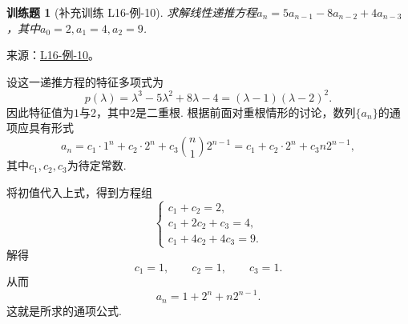 \documentclass[UTF8,12pt,a4paper,fontset=fandol]{ctexart}
\newtheorem{exercise}{训练题}[section]
\begin{document}
\begin{exercise}[补充训练 L16-例-10]\label{prob:L16-例-10}
求解线性递推方程$a_n = 5a_{n - 1} - 8a_{n - 2} + 4a_{n - 3}$，其中$a_0 = 2, a_1 = 4, a_2 = 9$.
\end{exercise}
\noindent 来源：\href{https://github.com/yhwu-is/Linear-Algebra-Left-Undone/blob/new/%E8%AE%B2%E4%B9%89/%E4%B8%93%E9%A2%98/16%20%E8%8B%A5%E5%BD%93%E6%A0%87%E5%87%86%E5%BD%A2.tex}{L16-例-10}。
\begin{solve}
设这一递推方程的特征多项式为
    \[
        p(\lambda)=\lambda^3-5\lambda^2+8\lambda-4=(\lambda-1)(\lambda-2)^2.
    \]
    因此特征值为$1$与$2$，其中$2$是二重根. 根据前面对重根情形的讨论，数列$\{a_n\}$的通项应具有形式
    \[
        a_n=c_1\cdot 1^n+c_2\cdot 2^n+c_3\binom{n}{1}2^{n-1}
        =c_1+c_2\cdot 2^n+c_3n2^{n-1},
    \]
    其中$c_1,c_2,c_3$为待定常数.

    将初值代入上式，得到方程组
    \[
        \begin{cases}
            c_1+c_2=2, \\
            c_1+2c_2+c_3=4, \\
            c_1+4c_2+4c_3=9.
        \end{cases}
    \]
    解得
    \[
        c_1=1,\qquad c_2=1,\qquad c_3=1.
    \]
    从而
    \[
        a_n=1+2^n+n2^{n-1}.
    \]
    这就是所求的通项公式.
\end{solve}
\end{document}
